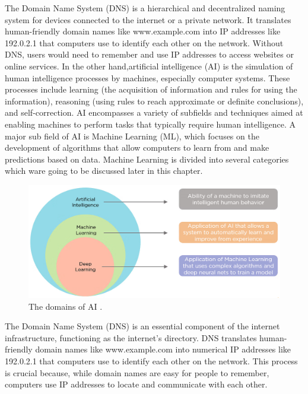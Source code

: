 
The Domain Name System (DNS) is a hierarchical and decentralized naming system for devices connected to the internet or a private network. It translates human-friendly domain names like www.example.com into IP addresses like 192.0.2.1 that computers use to identify each other on the network. Without DNS, users would need to remember and use IP addresses to access websites or online services. In the other hand,artificial intelligence (AI) is the simulation of human intelligence processes by machines, especially computer systems. These processes include learning (the acquisition of information and rules for using the information), reasoning (using rules to reach approximate or definite conclusions), and self-correction. AI encompasses a variety of subfields and techniques aimed at enabling machines to perform tasks that typically require human intelligence. A major sub field of AI is Machine Learning (ML), which focuses on the development of algorithms that allow computers to learn from and make predictions based on data. Machine Learning is divided into several categories which ware going to be discussed later in this chapter.

\begin{figure}[ht!]
	\centering
	\includegraphics[width=0.9\linewidth]{Chap1/images/MLvsDLvsIA}
	\caption{The domains of {AI} \cite{shruti2023aivs}.}
	\label{fig:mlvsdlvsia}
\end{figure}
The Domain Name System (DNS) is an essential component of the internet infrastructure, functioning as the internet's directory. DNS translates human-friendly domain names like www.example.com into numerical IP addresses like 192.0.2.1 that computers use to identify each other on the network. This process is crucial because, while domain names are easy for people to remember, computers use IP addresses to locate and communicate with each other.

